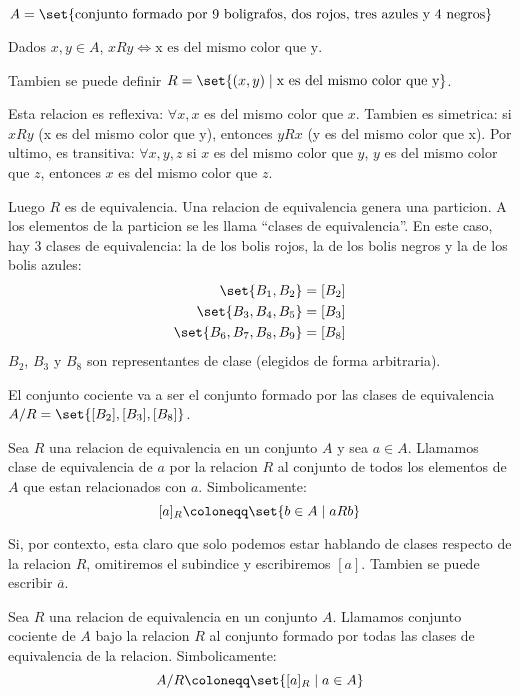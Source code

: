 \begin{example}
	~\\\(A = \set{\text{conjunto formado por 9 boligrafos, dos rojos, tres azules y 4 negros}}\)

	Dados \(x,y \in A \), \(xRy \iff \text{x es del mismo color que y}\).

	Tambien se puede definir \(R = \set{(x,y) \mid \text{x es del mismo color que y}}\).

	Esta relacion es reflexiva: \(\forall x, x \) es del mismo color que \(x \). Tambien es simetrica: si \(xRy \) (x es del mismo color que y), entonces \(yRx \) (y es del mismo color que x). Por ultimo, es transitiva: \(\forall x,y,z \) si \(x \) es del mismo color que \(y \), \(y \) es del mismo color que \(z \), entonces \(x \) es del mismo color que \(z. \)

	Luego \(R \) es de equivalencia. Una relacion de equivalencia genera una particion. A los elementos de la particion se les llama ``clases de equivalencia''. En este caso, hay 3 clases de equivalencia: la de los bolis rojos, la de los bolis negros y la de los bolis azules:
	\begin{align*}
		\set{B_1, B_2}        & = [B_2] \\
		\set{B_3, B_4, B_5}   & = [B_3] \\
		\set{B_6,B_7,B_8,B_9} & = [B_8]
	\end{align*}
	\(B_2\), \(B_3 \) y \(B_8 \) son representantes de clase (elegidos de forma arbitraria).

	El conjunto cociente va a ser el conjunto formado por las clases de equivalencia \(A/R = \set{[B_2], [B_3], [B_8]}\).

\end{example}

\begin{definition}
	Sea \(R \) una relacion de equivalencia en un conjunto \(A \) y sea \(a \in  A \). Llamamos clase de equivalencia de \(a \) por la relacion \(R \) al conjunto de todos los elementos de \(A \) que estan relacionados con \(a \). Simbolicamente:
	\[
		[a]_R \coloneqq \set{b \in A \mid aRb }
	\]

	Si, por contexto, esta claro que solo podemos estar hablando de clases respecto de la relacion \(R \), omitiremos el subindice y escribiremos \([a ]\). Tambien se puede escribir \(\overline{a} \).
\end{definition}
\begin{definition}
	Sea \(R \) una relacion de equivalencia en un conjunto \(A\). Llamamos conjunto cociente de \(A \) bajo la relacion \(R \) al conjunto formado por todas las clases de equivalencia de la relacion.  Simbolicamente:
	\[
		A/R \coloneqq \set{[a]_R \mid a \in A }
	\]
\end{definition}

